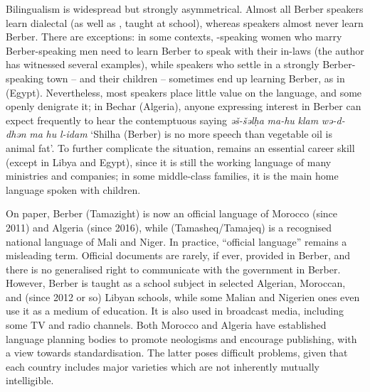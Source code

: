 \documentclass[output=paper]{langsci/langscibook}
\begin{document}
Bilingualism is widespread but strongly asymmetrical. Almost all Berber speakers learn dialectal  (as well as  , taught at school), whereas  speakers almost never learn Berber.  There are exceptions: in some contexts, -speaking women who marry Berber-speaking men need to learn Berber to speak with their in-laws (the author has witnessed several  examples), while  speakers who settle in a strongly Berber-speaking town – and their children – sometimes end up learning Berber, as in  (Egypt). Nevertheless, most  speakers place little value on the language, and some openly denigrate it; in Bechar (Algeria), anyone expressing interest in Berber can expect frequently to hear the contemptuous saying \textit{əš-šəlḥa} \textit{ma-hu} \textit{klam} \textit{wə-d-dhən} \textit{ma} \textit{hu} \textit{l-idam} `Shilha (Berber) is no more speech than vegetable oil is animal fat'. To further complicate the situation,  remains an essential career skill (except in Libya and Egypt), since it is still the working language of many ministries and companies; in some middle-class families, it is the main home language spoken with children.

On paper, Berber ({Tamazight}) is now an official language of Morocco (since 2011) and Algeria (since 2016), while  (Tamasheq/Tamajeq) is a recognised national language of {Mali} and Niger. In practice, “official language” remains a misleading term.  Official documents are rarely, if ever, provided in Berber, and there is no generalised right to communicate with the government in Berber.  However, Berber is taught as a school subject in selected Algerian, {Moroccan}, and (since 2012 or so) Libyan schools, while some Malian and Nigerien ones even use it as a medium of education. It is also used in broadcast media, including some TV and radio channels. Both Morocco and Algeria have established language planning bodies to promote neologisms and encourage publishing, with a view towards standardisation. The latter poses difficult problems, given that each country includes major varieties which are not inherently mutually intelligible.
\end{document}
